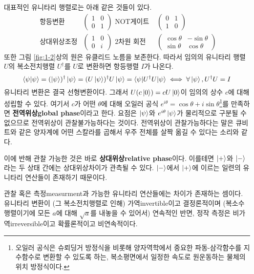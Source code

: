 \documentclass[a4paper,chapter,atbegshi]{oblivoir}
\begin{document}
대표적인 유니타리 행렬로는 아래 같은 것들이 있다.
\[\begin{matrix}
  \textrm{ 항등변환 }&\begin{pmatrix}1 & 0 \\ 0 & 1\end{pmatrix} 
  \textrm{ NOT게이트 }&\begin{pmatrix}0 & 1 \\ 1 & 0\end{pmatrix} \\
  \textrm{ 상대위상조정}&\begin{pmatrix}1&0\\0&i\end{pmatrix}
  \textrm{ 2차원 회전 }&\begin{pmatrix}\cos\theta & -\sin\theta\\
  \sin\theta &\cos\theta\end{pmatrix}
  \end{matrix}\]
또한 그림 \ref{fig:1-2}상의 원은 유클리드 노름을 보존한다. 따라서
임의의 유니타리 행렬 $U$의 복소전치행렬 $U^{\dagger}$를 $U$로 변환하면
항등행렬 $I$가 나온다.
\[
  \braket{\psi|\psi} = (\ket{\psi})^{\dagger}\ket{\psi} 
              = (U\ket{\psi})^{\dagger}U\ket{\psi}
              =\braket{\psi|U^{\dagger}U|\psi} 
  \iff\forall\ket{\psi},U^{\dagger}U= I
\]
유니타리 변환은 결국 선형변환이다. 그래서 $U(c\ket0)=cU\ket0$이 임의의 상수 $c$에 
대해 성립할 수 있다. 여기서 $c$가 어떤 $\theta$에 대해 오일러 공식 
$e^{i\theta}=\cos\theta+i\sin\theta$\footnote{오일러 공식은 슈뢰딩거
방정식을 비롯해 양자역학에서 중요한 파동-삼각함수를 지수함수로 변환할 수 있도록
하는, 복소평면에서 일정한 속도로 원운동하는 물체의 위치 방정식이다.}를 만족하면 
\textbf{전역위상\tiny global phase}이라고 한다. 요점은 $\ket{\psi}$와 
$e^{i\theta}\ket{\psi}$가 물리적으로 구분될 수 없으므로 전역위상이
관찰불가능하다는 것이다. 전역위상이 관찰가능하다는 말은 큐비트와 같은
양자계에 어떤 스칼라를 곱해서 우주 전체를 살짝 옮길 수 있다는
소리와 같다.

이에 반해 관찰 가능한 것은 바로 \textbf{상대위상\tiny relative
phase}이다. 이를테면 $\ket+$와 $\ket-$라는 두 상태 간에는 상대위상차이가 관측될
수 있다. $\ket-$에서 $\ket+$에 이르는 일련의 유니타리 연산들이 존재하기 때문이다.

관찰 혹은 측정{\tiny measurment}과 가능한 유니타리 연산들에는 차이가 존재하는
셈이다. 유니타리 변환이 (그 복소전치행렬로 인해) 가역{\tiny invertible}이고
결정론적이며 (복소수 행렬이기에 모든 $a$에 대해 $\sqrt{a}$를 내놓을 수 있어서)
연속적인 반면, 정작 측정은 비가역{\tiny irreversible}이고 확률론적이고
비연속적이다. 
\end{document}
